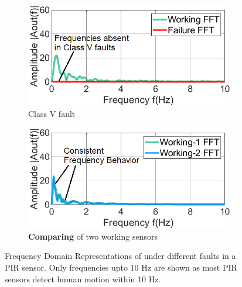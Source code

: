 \begin{figure}
\begin{subfigure}[t]{0.33\linewidth}
		\includegraphics[width=\linewidth]{figures/2-PIR-Fault/normal-classV/class5_fft_coloradj_small_edited_camera_ready.png}
		\caption{Class V fault}
		\label{fig:classV_fault_freq}
	\end{subfigure}
	\begin{subfigure}[t]{0.325\linewidth}
		\centering
		\includegraphics[width=\linewidth]{figures/2-PIR-Fault/normal-normal/normal_normal_fft_coloradj_small_edited_camera_ready.png}
		\caption{\textbf{Comparing} \aout of two working sensors}
		\label{fig:normal_normal_freq}
	\end{subfigure}
	\caption{\footnotesize{Frequency Domain Representations} of \aout under different faults in a PIR sensor. Only frequencies upto 10 Hz are shown as most PIR sensors detect human motion within 10 Hz.}
	\label{fig:classI-V_fault_freq}	
\end{figure}
